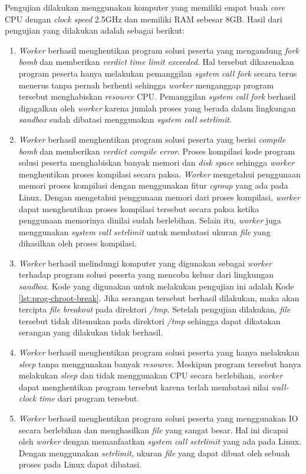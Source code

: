 \par Pengujian dilakukan menggunakan komputer yang memiliki empat buah \textit{core} CPU dengan \textit{clock speed} 2.5GHz dan memiliki RAM sebesar 8GB. Hasil dari pengujian yang dilakukan adalah sebagai berikut:
\begin{enumerate}
  \item \textit{Worker} berhasil menghentikan program solusi peserta yang mengandung \textit{fork bomb} dan memberikan \textit{verdict} \textit{time limit exceeded}. Hal tersebut dikarenakan program peserta hanya melakukan pemanggilan \textit{system call fork} secara terus menerus tanpa pernah berhenti sehingga \textit{worker} menganggap program tersebut menghabiskan \textit{resource} CPU. Pemanggilan \textit{system call} \textit{fork} berhasil digagalkan oleh \textit{worker} karena jumlah proses yang berada dalam lingkungan \textit{sandbox} sudah dibatasi menggunakan \textit{system call} \textit{setrlimit}.
  \item \textit{Worker} berhasil menghentikan program solusi peserta yang berisi \textit{compile bomb} dan memberikan \textit{verdict} \textit{compile error}. Proses kompilasi kode program solusi peserta menghabiskan banyak memori dan \textit{disk space} sehingga \textit{worker} menghentikan proses kompilasi secara paksa. \textit{Worker} mengetahui penggunaan memori proses kompilasi dengan menggunakan fitur \textit{cgroup} yang ada pada Linux. Dengan mengetahui penggunaan memori dari proses kompilasi, \textit{worker} dapat menghentikan proses kompilasi tersebut secara paksa ketika penggunaan memorinya dinilai sudah berlebihan. Selain itu, \textit{worker} juga menggunakan \textit{system call setrlimit} untuk membatasi ukuran \textit{file} yang dihasilkan oleh proses kompilasi. 
  \item \textit{Worker} berhasil melindungi komputer yang digunakan sebagai \textit{worker} terhadap program solusi peserta yang mencoba keluar dari lingkungan \textit{sandbox}. Kode yang digunakan untuk melakukan pengujian ini adalah Kode \ref{lst:prog-chroot-break}. Jika serangan tersebut berhasil dilakukan, maka akan tercipta \textit{file breakout} pada direktori \textit{/tmp}. Setelah pengujian dilakukan, \textit{file} tersebut tidak ditemukan pada direktori \textit{/tmp} sehingga dapat dikatakan serangan yang dilakukan tidak berhasil.
  \item \textit{Worker} berhasil menghentikan program solusi peserta yang hanya melakukan \textit{sleep} tanpa menggunakan banyak \textit{resource}. Meskipun program tersebut hanya melakukan \textit{sleep} dan tidak menggunakan CPU secara berlebihan, \textit{worker} dapat menghentikan program tersebut karena terlah membatasi nilai \textit{wall-clock time} dari program tersebut.
  \item \textit{Worker} berhasil menghentikan program solusi peserta yang menggunakan IO secara berlebihan dan menghasilkan \textit{file} yang sangat besar. Hal ini dicapai oleh \textit{worker} dengan memanfaatkan \textit{system call setrlimit} yang ada pada Linux. Dengan menggunakan \textit{setrlimit}, ukuran \textit{file} yang dapat dibuat oleh sebuah proses pada Linux dapat dibatasi.
\end{enumerate}

